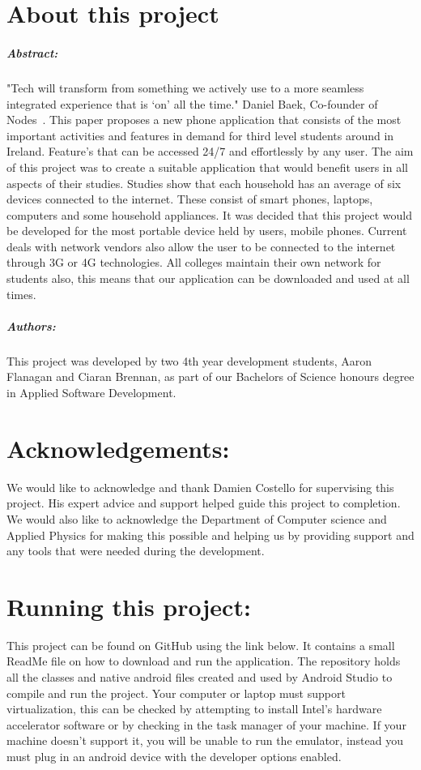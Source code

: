 
\chapter*{About this project}
\paragraph{Abstract:}
"Tech will transform from something we actively use to a more seamless integrated experience that is ‘on’ all the time." Daniel Baek, Co-founder of Nodes~\cite{nodes}. This paper proposes a new phone application that consists of the most important activities and features in demand for third level students around in Ireland. Feature's that can be accessed 24/7 and effortlessly by any user. The aim of this project was to create a suitable application that would benefit users in all aspects of their studies. Studies show that each household has an average of six devices connected to the internet. These consist of smart phones, laptops, computers and some household appliances. It was decided that this project would be developed for the most portable device held by users, mobile phones. Current deals with network vendors also allow the user to be connected to the internet through 3G or 4G technologies. All colleges maintain their own network for students also, this means that our application can be downloaded and used at all times.

\paragraph{Authors:}
This project was developed by two 4th year development students, Aaron Flanagan and Ciaran Brennan, as part of our Bachelors of Science honours degree in Applied Software Development.

\chapter*{Acknowledgements:}
We would like to acknowledge and thank Damien Costello for supervising this project. His expert advice and support helped guide this project to completion. We would also like to acknowledge the Department of Computer science and Applied Physics for making this possible and helping us by providing support and any tools that were needed during the development.

\chapter*{Running this project:}
This project can be found on GitHub using the link below.
It contains a small ReadMe file on how to download and run the application. The repository holds all the classes and native android files created and used by Android Studio to compile and run the project. Your computer or laptop must support virtualization, this can be checked by attempting to install Intel's hardware accelerator software or by checking in the task manager of your machine. If your machine doesn't support it, you will be unable to run the emulator, instead you must plug in an android device with the developer options enabled.
